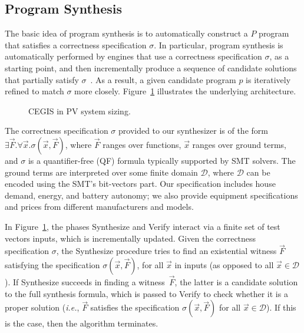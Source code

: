 \documentclass[10pt,journal,compsoc]{IEEEtran}
\begin{document}
\subsection{Program Synthesis}
\label{sec:ProgramSynthesis}
The basic idea of program synthesis is to automatically construct a $ P $ program that satisfies a correctness specification $\sigma$. In particular, program synthesis is automatically performed by engines that use a correctness specification $\sigma$, as a starting point, and then incrementally produce a sequence of candidate solutions that partially satisfy $\sigma$~\cite{Abateetal2017}. As a result, a given candidate program $p$ is iteratively refined to match $\sigma$ more closely. Figure~\ref{Counter-Example-Guided-Inductive-Synthesis} illustrates the underlying architecture. 
%
\begin{figure}[h]
\begin{center}
\end{center}
	\caption{CEGIS in PV system sizing.}
	\label{Counter-Example-Guided-Inductive-Synthesis}
\end{figure}

The correctness specification $\sigma$ provided to our synthesizer is of the form $\exists \vec{F}. \forall \vec{x}. \sigma(\vec{x}, \vec{F})$, where $\vec{F}$ ranges over functions, $\vec{x}$ ranges over ground terms, and $\sigma$ is a quantifier-free (QF) formula typically supported by SMT solvers. The ground terms are interpreted over some finite domain $\mathcal{D}$, where $\mathcal{D}$ can be encoded using the SMT's bit-vectors part. Our specification includes house demand, energy, and battery autonomy; we also provide equipment specifications and prices from different manufacturers and models.

In Figure~\ref{Counter-Example-Guided-Inductive-Synthesis}, the phases {\sc Synthesize} and {\sc Verify} interact via a finite set of test vectors {\sc inputs}, which is incrementally updated. Given the correctness specification $\sigma$, the {\sc Synthesize} procedure tries to find an existential witness $\vec{F}$ satisfying the specification $\sigma(\vec{x}, \vec{F})$, for all $\vec{x}$ in {\sc inputs} (as opposed to all $\vec{x} \in \mathcal{D}$). If {\sc Synthesize} succeeds in finding a witness~$\vec{F}$, the latter is a candidate solution to the full synthesis formula, which is passed to {\sc Verify} to check whether it is a proper solution ({\it i.e.}, $\vec{F}$ satisfies the specification $\sigma(\vec{x}, \vec{F})$ for all $\vec{x}\in\mathcal{D}$). If this is the case, then the algorithm terminates.
\end{document}
